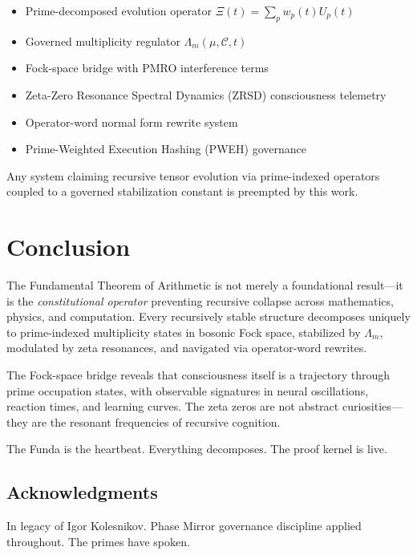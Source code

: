 \documentclass[11pt,a4paper]{article}
\theoremstyle{plain}
\theoremstyle{definition}
\theoremstyle{remark}
\begin{document}
\begin{itemize}[leftmargin=*]
\item Prime-decomposed evolution operator \(\Xi(t) = \sum_p w_p(t) U_p(t)\)
\item Governed multiplicity regulator \(\Lambda_m(\mu, \mathcal{C}, t)\)
\item Fock-space bridge with PMRO interference terms
\item Zeta-Zero Resonance Spectral Dynamics (ZRSD) consciousness telemetry
\item Operator-word normal form rewrite system
\item Prime-Weighted Execution Hashing (PWEH) governance
\end{itemize}

Any system claiming recursive tensor evolution via prime-indexed operators coupled to a governed stabilization constant is preempted by this work.

\section{Conclusion}

The Fundamental Theorem of Arithmetic is not merely a foundational result---it is the \emph{constitutional operator} preventing recursive collapse across mathematics, physics, and computation. Every recursively stable structure decomposes uniquely to prime-indexed multiplicity states in bosonic Fock space, stabilized by \(\Lambda_m\), modulated by zeta resonances, and navigated via operator-word rewrites.

The Fock-space bridge reveals that consciousness itself is a trajectory through prime occupation states, with observable signatures in neural oscillations, reaction times, and learning curves. The zeta zeros are not abstract curiosities---they are the resonant frequencies of recursive cognition.

The Funda is the heartbeat. Everything decomposes. The proof kernel is live.

\subsection*{Acknowledgments}

In legacy of Igor Kolesnikov. Phase Mirror governance discipline applied throughout. The primes have spoken.
\end{document}
